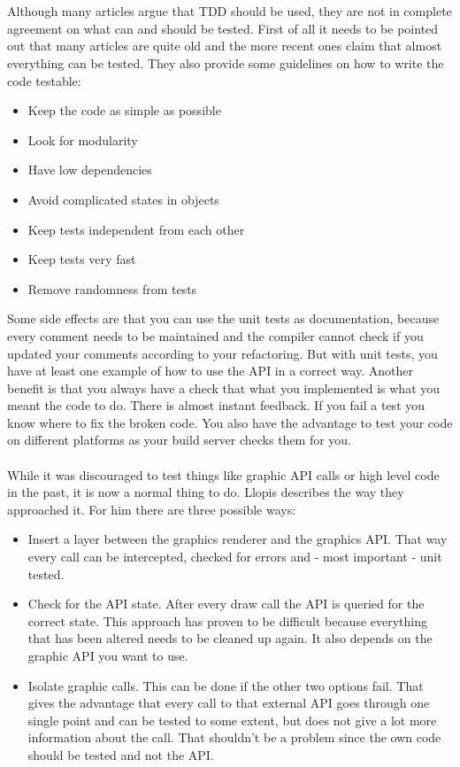     \\ \\
    Although many articles argue that TDD should be used, they are not in complete agreement on what can and should be tested. First of all it needs to be pointed out that many articles are quite old and the more recent ones claim that almost everything can be tested. They also provide some guidelines on how to write the code testable:
    \begin{itemize}
        \item Keep the code as simple as possible
        \item Look for modularity
        \item Have low dependencies
        \item Avoid complicated states in objects
        \item Keep tests independent from each other
        \item Keep tests very fast
        \item Remove randomness from tests
    \end{itemize}
    Some side effects are that you can use the unit tests as documentation, because every comment needs to be maintained and the compiler cannot check if you updated your comments according to your refactoring.
    But with unit tests, you have at least one example of how to use the API in a correct way. Another benefit is that you always have a check that what you implemented is what you meant the code to do. There is almost instant feedback. If you fail a test you know where to fix the broken code. You also have the advantage to test your code on different platforms as your build server checks them for you. 
    \\ \\
    While it was discouraged to test things like graphic API calls or high level code in the past, it is now a normal thing to do. Llopis describes the way they approached it. For him there are three possible ways:
    \begin{itemize}
        \item Insert a layer between the graphics renderer and the graphics API. That way every call can be intercepted, checked for errors and - most important - unit tested. 
        \item Check for the API state. After every draw call the API is queried for the correct state. This approach has proven to be difficult because everything that has been altered needs to be cleaned up again. It also depends on the graphic API you want to use.
        \item Isolate graphic calls. This can be done if the other two options fail. 
            That gives the advantage that every call to that external API goes through one single point and can be tested to some extent, but does not give a lot more information about the call. That shouldn't be a problem since the own code should be tested and not the API.
    \end{itemize}


